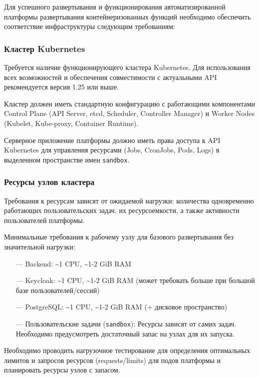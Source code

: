 Для успешного развертывания и функционирования автоматизированной платформы развертывания контейнеризованных функций необходимо обеспечить соответствие инфраструктуры следующим требованиям:

\subsubsection{Кластер Kubernetes}

Требуется наличие функционирующего кластера Kubernetes. Для использования всех возможностей и обеспечения совместимости с актуальными API рекомендуется версия 1.25 или выше.

Кластер должен иметь стандартную конфигурацию с работающими компонентами Control Plane (API Server, etcd, Scheduler, Controller Manager) и Worker Nodes (Kubelet, Kube-proxy, Container Runtime).

Серверное приложение платформы должно иметь права доступа к API Kubernetes для управления ресурсами (Jobs, CronJobs, Pods, Logs) в выделенном пространстве имен \texttt{sandbox}.

\subsubsection{Ресурсы узлов кластера}

Требования к ресурсам зависят от ожидаемой нагрузки: количества одновременно работающих пользовательских задач, их ресурсоемкости, а также активности пользователей платформы.

Минимальные требования к рабочему узлу для базового развертывания без значительной нагрузки:

\begin{itemize}
    \item[---] Backend: \textasciitilde 1 CPU, \textasciitilde 1-2 GiB RAM
    \item[---] Keycloak: \textasciitilde 1 CPU, \textasciitilde 1-2 GiB RAM (может требовать больше при большой базе пользователей/сессий)
    \item[---] PostgreSQL: \textasciitilde 1 CPU, \textasciitilde 1-2 GiB RAM (+ дисковое пространство)
    \item[---] Пользовательские задачи (\texttt{sandbox}): Ресурсы зависят от самих задач. Необходимо предусмотреть достаточный запас на узлах для их запуска.
\end{itemize}

Необходимо проводить нагрузочное тестирование для определения оптимальных лимитов и запросов ресурсов (requests/limits) для подов платформы и планировать ресурсы узлов с запасом.

